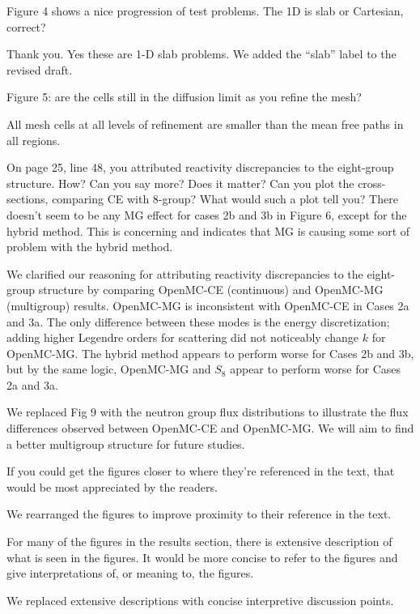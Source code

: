 \documentclass[answers,11pt]{exam}
\begin{document}
\begin{questions}
    \question Figure 4 shows a nice progression of test problems. The 1D is slab or Cartesian, correct?
    \begin{solution}
        Thank you. Yes these are 1-D slab problems. We added the ``slab'' label to the revised draft.
    \end{solution}

    \question Figure 5: are the cells still in the diffusion limit as you refine the mesh?
    \begin{solution}
        All mesh cells at all levels of refinement are smaller than the mean free paths in all
        regions.
    \end{solution}

    \question On page 25, line 48, you attributed reactivity discrepancies to the eight-group structure. How? Can you say more? Does it matter? Can you plot the cross-sections, comparing CE with 8-group? What would such a plot tell you? There doesn't seem to be any MG effect for cases 2b and 3b in Figure 6, except for the hybrid method. This is concerning and indicates that MG is causing some sort of problem with the hybrid method.
    \begin{solution}
        We clarified our reasoning for attributing reactivity discrepancies to the eight-group
        structure by comparing OpenMC-CE (continuous) and OpenMC-MG (multigroup) results. OpenMC-MG
        is inconsistent with OpenMC-CE in Cases 2a and 3a. The only difference between these modes
        is the energy discretization; adding higher Legendre orders for scattering did not
        noticeably change $k$ for OpenMC-MG. The hybrid method appears to perform worse for Cases
        2b and 3b, but by the same logic, OpenMC-MG and $S_8$ appear to perform worse for Cases 2a and
        3a.

        We replaced Fig 9 with the neutron group flux distributions to illustrate the flux differences
        observed between OpenMC-CE and OpenMC-MG. We will aim to find a better multigroup structure
        for future studies.
    \end{solution}

    \question If you could get the figures closer to where they're referenced in the text, that would be most appreciated by the readers.
    \begin{solution}
        We rearranged the figures to improve proximity to their reference in the text.
    \end{solution}

    \question For many of the figures in the results section, there is extensive description of what is seen in the figures. It would be more concise to refer to the figures and give interpretations of, or meaning to, the figures.
    \begin{solution}
        We replaced extensive descriptions with concise interpretive discussion points.
    \end{solution}


\end{questions}
\end{document}
